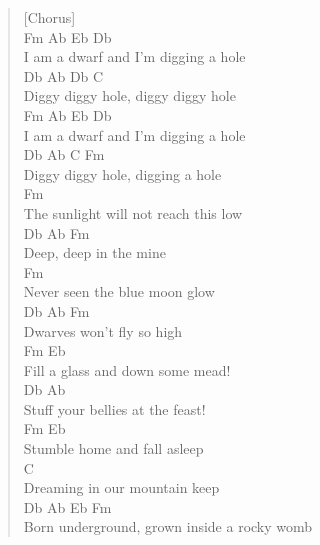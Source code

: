 \documentclass[11pt]{article}
\begin{document}
\begin{verse}
[Chorus]\\
\vspace*{1em}
Fm     Ab            Eb      Db\\
I am a dwarf and I'm digging a hole\\
\vspace*{1em}
Db         Ab   Db          C\\
Diggy diggy hole, diggy diggy hole\\
\vspace*{1em}
Fm     Ab           Eb       Db\\
I am a dwarf and I'm digging a hole\\
\vspace*{1em}
Db         Ab    C        Fm\\
Diggy diggy hole, digging a hole\\
\vspace*{1em}
\vspace*{1em}
Fm\\
The sunlight will not reach this low\\
\vspace*{1em}
Db    Ab        Fm\\
Deep, deep in the mine\\
\vspace*{1em}
Fm\\
Never seen the blue moon glow\\
\vspace*{1em}
Db     Ab           Fm\\
Dwarves won't fly so high\\
\vspace*{1em}
Fm               Eb\\
Fill a glass and down some mead!\\
\vspace*{1em}
Db                 Ab\\
Stuff your bellies at the feast!\\
\vspace*{1em}
Fm               Eb\\
Stumble home and fall asleep\\
\vspace*{1em}
C\\
Dreaming in our mountain keep\\
\vspace*{1em}
\vspace*{1em}
Db         Ab      Eb            Fm\\
Born underground, grown inside a rocky womb\\

\end{verse}
\end{document}
